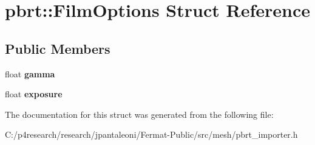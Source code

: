 \hypertarget{structpbrt_1_1_film_options}{}\section{pbrt\+:\+:Film\+Options Struct Reference}
\label{structpbrt_1_1_film_options}
\subsection*{Public Members}
\begin{DoxyCompactItemize}
\item 
\mbox{\label{structpbrt_1_1_film_options_ac9cf92f2297a3564824ff0560c17d7c4}} 
float {\bfseries gamma}
\item 
\mbox{\label{structpbrt_1_1_film_options_ac7b04665742690c76aa576d3fdf98c9f}} 
float {\bfseries exposure}
\end{DoxyCompactItemize}


The documentation for this struct was generated from the following file\+:\begin{DoxyCompactItemize}
\item 
C\+:/p4research/research/jpantaleoni/\+Fermat-\/\+Public/src/mesh/pbrt\+\_\+importer.\+h\end{DoxyCompactItemize}
